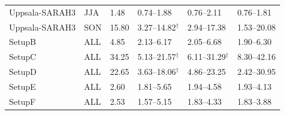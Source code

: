 \begin{table}[H]
\begin{tabular}{@{}llllll@{}}
Uppsala-SARAH3 & JJA & 1.48 & 0.74--1.88 & 0.76--2.11 & 0.76--1.81\\
Uppsala-SARAH3 & SON & 15.80 & 3.27--14.82$^\dagger$ & 2.94--17.38 & 1.53--20.08\\
SetupB & ALL & 4.85 & 2.13--6.17 & 2.05--6.68 & 1.90--6.30\\
SetupC & ALL & 34.25 & 5.13--21.57$^\dagger$ & 6.11--31.29$^\dagger$ & 8.30--42.16\\
SetupD & ALL & 22.65 & 3.63--18.06$^\dagger$ & 4.86--23.25 & 2.42--30.95\\
SetupE & ALL & 2.60 & 1.81--5.65 & 1.94--4.58 & 1.93--4.13\\
SetupF & ALL & 2.53 & 1.57--5.15 & 1.83--4.33 & 1.83--3.88\\
\bottomrule\end{tabular}\end{table}

